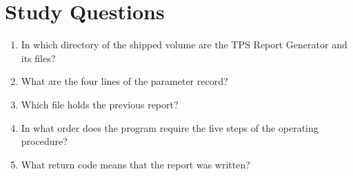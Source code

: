 \section{Study Questions}
\begin{enumerate}
\item In which directory of the shipped volume are the TPS Report Generator
  and its files?
\item What are the four lines of the parameter record?
\item Which file holds the previous report?
\item In what order does the program require the five steps of the
  operating procedure?
\item What return code means that the report was written?
\end{enumerate}
